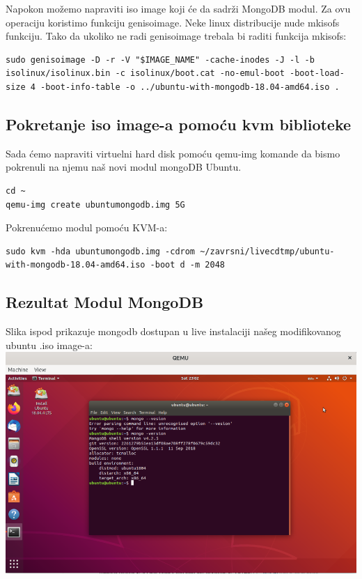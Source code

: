 \documentclass[12pt,vi]{mitthesis}
\begin{document}
\noindent
Napokon možemo napraviti iso image koji će da sadrži MongoDB modul. Za ovu operaciju koristimo funkciju genisoimage. Neke linux distribucije nude mkisofs funkciju. Tako da ukoliko ne radi genisoimage trebala bi raditi funkcija mkisofs:
\begin{lstlisting}[style=BashInputStyle]
sudo genisoimage -D -r -V "$IMAGE_NAME" -cache-inodes -J -l -b isolinux/isolinux.bin -c isolinux/boot.cat -no-emul-boot -boot-load-size 4 -boot-info-table -o ../ubuntu-with-mongodb-18.04-amd64.iso .
\end{lstlisting}

\subsection*{Pokretanje iso image-a pomoću kvm biblioteke}
\indent
Sada ćemo napraviti virtuelni hard disk pomoću qemu-img komande da bismo pokrenuli na njemu naš novi modul mongoDB Ubuntu.
\begin{lstlisting}[style=BashInputStyle]
cd ~
qemu-img create ubuntumongodb.img 5G
\end{lstlisting}

\noindent 
Pokrenućemo modul pomoću KVM-a:
\begin{lstlisting}[style=BashInputStyle]
sudo kvm -hda ubuntumongodb.img -cdrom ~/zavrsni/livecdtmp/ubuntu-with-mongodb-18.04-amd64.iso -boot d -m 2048
\end{lstlisting}

\subsection*{Rezultat Modul MongoDB}
\indent
Slika ispod prikazuje mongodb dostupan u live instalaciji našeg modifikovanog ubuntu .iso image-a:
\includegraphics[width=\linewidth]{images/mongoLive.png} 
\newpage
\end{document}
